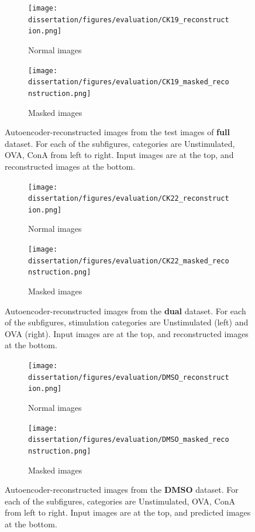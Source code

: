 \begin{figure}[h!]
    \centering
    \begin{subfigure}[h!]{0.45\textwidth}
        \texttt{[image: dissertation/figures/evaluation/CK19\_reconstruction.png]}
        \caption{Normal images}
    \end{subfigure}
    \begin{subfigure}[h!]{0.45\textwidth}
        \texttt{[image: dissertation/figures/evaluation/CK19\_masked\_reconstruction.png]}
        \caption{Masked images}
    \end{subfigure}
    \caption{Autoencoder-reconstructed images from the test images of \textbf{full} dataset. For each of the subfigures, categories are Unstimulated, OVA, ConA from left to right. Input images are at the top, and reconstructed images at the bottom.}
    \label{fig:full_reconstruction}
\end{figure}

\begin{figure}[h!]
    \centering
    \begin{subfigure}[h!]{0.3\textwidth}
\texttt{[image: dissertation/figures/evaluation/CK22\_reconstruction.png]}
        \caption{Normal images}
    \end{subfigure}
    \begin{subfigure}[h!]{0.3\textwidth}
        \texttt{[image: dissertation/figures/evaluation/CK22\_masked\_reconstruction.png]}
        \caption{Masked images}
        \label{fig:dual_masked_recon}
    \end{subfigure}
    \caption{Autoencoder-reconstructed images from the \textbf{dual} dataset. For each of the subfigures, stimulation categories are Unstimulated (left) and OVA (right). Input images are at the top, and reconstructed images at the bottom.}
    \label{fig:dual_reconstruction}
\end{figure}

\begin{figure}[h!]
    \centering
    \begin{subfigure}[h!]{0.45\textwidth}
        \texttt{[image: dissertation/figures/evaluation/DMSO\_reconstruction.png]}
        \caption{Normal images}
    \end{subfigure}
    \begin{subfigure}[h!]{0.46\textwidth}
        \texttt{[image: dissertation/figures/evaluation/DMSO\_masked\_reconstruction.png]}
        \caption{Masked images}
        \label{fig:dmso_masked_recon}
    \end{subfigure}
    \caption{Autoencoder-reconstructed images from the \textbf{DMSO} dataset. For each of the subfigures, categories are Unstimulated, OVA, ConA from left to right. Input images are at the top, and predicted images at the bottom.}
    \label{fig:dmso_reconstruction}
\end{figure}

